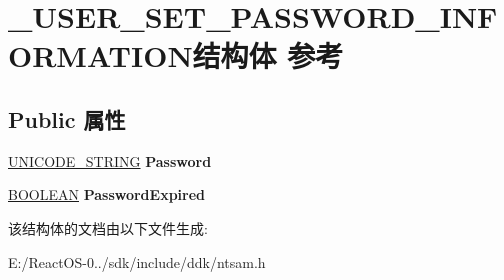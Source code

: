 \hypertarget{struct___u_s_e_r___s_e_t___p_a_s_s_w_o_r_d___i_n_f_o_r_m_a_t_i_o_n}{}\section{\+\_\+\+U\+S\+E\+R\+\_\+\+S\+E\+T\+\_\+\+P\+A\+S\+S\+W\+O\+R\+D\+\_\+\+I\+N\+F\+O\+R\+M\+A\+T\+I\+O\+N结构体 参考}
\label{struct___u_s_e_r___s_e_t___p_a_s_s_w_o_r_d___i_n_f_o_r_m_a_t_i_o_n}
\subsection*{Public 属性}
\begin{DoxyCompactItemize}
\item 
\mbox{\label{struct___u_s_e_r___s_e_t___p_a_s_s_w_o_r_d___i_n_f_o_r_m_a_t_i_o_n_a7ccb8cd98e19ae552b875708cde35b77}} 
\hyperlink{struct___u_n_i_c_o_d_e___s_t_r_i_n_g}{U\+N\+I\+C\+O\+D\+E\+\_\+\+S\+T\+R\+I\+NG} {\bfseries Password}
\item 
\mbox{\label{struct___u_s_e_r___s_e_t___p_a_s_s_w_o_r_d___i_n_f_o_r_m_a_t_i_o_n_a9845ce1a43c64ab9c660544508bc0b70}} 
\hyperlink{_processor_bind_8h_a112e3146cb38b6ee95e64d85842e380a}{B\+O\+O\+L\+E\+AN} {\bfseries Password\+Expired}
\end{DoxyCompactItemize}


该结构体的文档由以下文件生成\+:\begin{DoxyCompactItemize}
\item 
E\+:/\+React\+O\+S-\/0../sdk/include/ddk/ntsam.\+h\end{DoxyCompactItemize}
